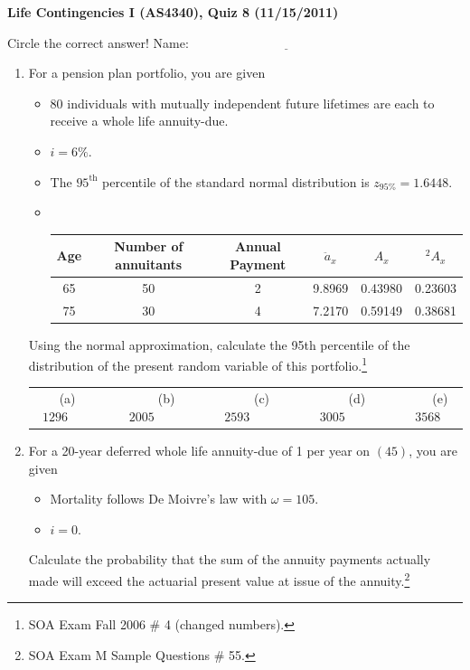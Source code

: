 \documentclass[11pt,fleqn,oneside]{book}
\begin{document}

\newpage

\thispagestyle{empty}
\setcounter{page}{1}
\begin{center}
{ \large \bf Life Contingencies I (AS4340), Quiz 8 (11/15/2011)}
\end{center}
\noindent
Circle the correct answer! Name: $\underline{\;\;\;\;\;\;\;\;\;\;\;\;\;\;\;\;\;\;\;\;\;\;\;\;\;\;\;\;\;\;\;\;\;\;\;\;\;\;\;\;\;\;\;\;\;\;\;\;\;\;\;\;\;}$
\begin{enumerate}
\item  For a pension plan portfolio, you are given
\begin{itemize}
\item 80 individuals with mutually independent future lifetimes are each to receive a whole life annuity-due.
\item $i=6\%$.
\item The $95^{\text{th}}$ percentile of the standard normal distribution is $z_{95\%}= 1.6448$.
\item $\;$

\begin{center}
\small
\begin{tabular}{| c | c | c | c | c | c|}
\hline
Age & Number of annuitants & Annual Payment & $\ddot{a}_x$ & $A_x$ & ${^2A_x}$ \\
\hline
65 & 50 & 2 & 9.8969 & 0.43980 & 0.23603 \\
75 & 30 & 4 & 7.2170 & 0.59149 & 0.38681 \\ 
\hline
\end{tabular}
\end{center}
\end{itemize}
\normalsize
Using the normal approximation, calculate the 95th percentile of the distribution of the present random variable of this portfolio.\footnote[1]{SOA Exam Fall 2006 \# 4 (changed numbers).}

\begin{center}
\small\begin{tabular}{c c c c c}
(a) $1296\;\;\;\;\;\;\;$ & 
$\;\;\;\;\;\;\;$(b) $2005\;\;\;\;\;\;\;$ &
$\;\;\;\;\;\;\;$(c) $2593\;\;\;\;\;\;\;$ & 
$\;\;\;\;\;\;\;$(d) $3005\;\;\;\;\;\;\;$ &
$\;\;\;\;\;\;\;$(e) $3568$
\end{tabular}
\end{center}
\normalsize

\item For a 20-year deferred whole life annuity-due of 1 per year on $(45)$, you are given
\begin{itemize}
\item Mortality follows De Moivre's law with $\omega = 105$.
\item $i=0$.
\end{itemize}
Calculate the probability that the sum of the annuity payments actually made will exceed the actuarial present value at issue of the annuity.\footnote[2]{SOA Exam M Sample Questions \# 55.}


\end{enumerate}
\end{document}
